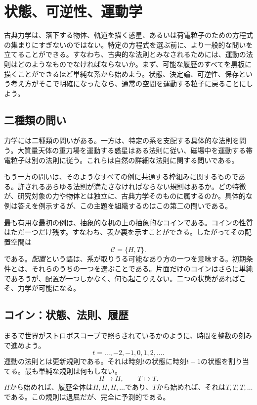 \chapter{状態、可逆性、運動学}

古典力学は、落下する物体、軌道を描く惑星、あるいは荷電粒子のための方程式の集まりにすぎないのではない。特定の方程式を選ぶ前に、より一般的な問いを立てることができる。すなわち、古典的な法則とみなされるためには、運動の法則はどのようなものでなければならないか。まず、可能な履歴のすべてを黒板に描くことができるほど単純な系から始めよう。状態、決定論、可逆性、保存という考え方がそこで明確になったなら、通常の空間を運動する粒子に戻ることにしよう。

\section{二種類の問い}

力学には二種類の問いがある。一方は、特定の系を支配する具体的な法則を問う。大質量天体の重力場を運動する惑星はある法則に従い、磁場中を運動する帯電粒子は別の法則に従う。これらは自然の詳細な法則に関する問いである。

もう一方の問いは、そのようなすべての例に共通する枠組みに関するものである。許されるあらゆる法則が満たさなければならない規則はあるか。どの特徴が、研究対象の力や物体とは独立に、古典力学そのものに属するのか。具体的な例は答えを例示するが、この主題を組織するのはこの第二の問いである。

最も有用な最初の例は、抽象的な机の上の抽象的なコインである。コインの性質はただ一つだけ残す。すなわち、表か裏を示すことができる。したがってその配置空間は
\begin{equation}
  \mathcal C=\{H,T\}.
\end{equation}
である。\emph{配置}という語は、系が取りうる可能なあり方の一つを意味する。初期条件とは、それらのうちの一つを選ぶことである。片面だけのコインはさらに単純であろうが、配置が一つしかなく、何も起こりえない。二つの状態があればこそ、力学が可能になる。

\section{コイン：状態、法則、履歴}

まるで世界がストロボスコープで照らされているかのように、時間を整数の刻みで進めよう。
\begin{equation}
  t=\ldots,-2,-1,0,1,2,\ldots .
\end{equation}
運動の法則とは更新規則である。それは時刻\(t\)の状態に時刻\(t+1\)の状態を割り当てる。最も単純な規則は何もしない。
\begin{equation}
  H\longmapsto H,
  \qquad
  T\longmapsto T.
  \label{eq:coin-identity}
\end{equation}
\(H\)から始めれば、履歴全体は\(H,H,H,\ldots\)であり、\(T\)から始めれば、それは\(T,T,T,\ldots\)である。この規則は退屈だが、完全に予測的である。

